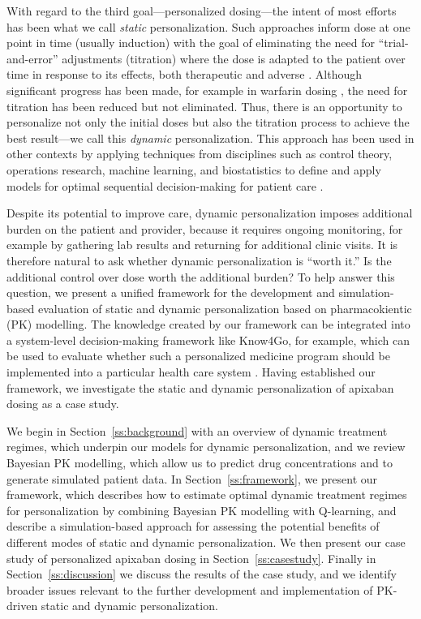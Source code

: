 With regard to the third goal---personalized dosing---the intent of most efforts has been what we call \textit{static} personalization. Such approaches inform dose at one point in time (usually induction) with the goal of eliminating the need for ``trial-and-error'' adjustments (titration) where the dose is adapted to the patient over time in response to its effects, both therapeutic and adverse \cite{morse2015personalized}. Although significant progress has been made, for example in warfarin dosing \cite{gong2011prospective}, the need for titration has been reduced but not eliminated. Thus, there is an opportunity to personalize not only the initial doses but also the titration process to achieve the best result---we call this \textit{dynamic} personalization. This approach has been used in other contexts by applying techniques from disciplines such as control theory, operations research, machine learning, and biostatistics to define and apply models for optimal sequential decision-making for patient care \cite{zhang2021identifying, engelhardt2021importance}.

Despite its potential to improve care, dynamic personalization imposes additional burden on the patient and provider, because it requires ongoing monitoring, for example by gathering lab results and returning for additional clinic visits. It is therefore natural to ask whether dynamic personalization is ``worth it.'' Is the additional control over dose worth the additional burden? To help answer this question, we present a unified framework for the development and simulation-based evaluation of static and dynamic personalization based on pharmacokientic (PK) modelling. The knowledge created by our framework can be integrated into a system-level decision-making framework like Know4Go, for example, which can be used to evaluate whether such a personalized medicine program should be implemented into a particular health care system \cite{Martin2016}. Having established our framework, we investigate the static and dynamic personalization of apixaban dosing as a case study.

We begin in Section~\ref{ss:background} with an overview of dynamic treatment regimes, which underpin our models for dynamic personalization, and we review Bayesian PK modelling, which allow us to predict drug concentrations and to generate simulated patient data. In Section~\ref{ss:framework}, we present our framework, which describes how to estimate  optimal dynamic treatment regimes for personalization by combining Bayesian PK modelling with Q-learning, and describe a simulation-based approach for assessing the potential benefits of different modes of static and dynamic personalization.  We then present our case study of personalized apixaban dosing in Section~\ref{ss:casestudy}. Finally in Section~\ref{ss:discussion} we discuss the results of the case study, and we identify broader issues relevant to the further development and implementation of PK-driven static and dynamic personalization.